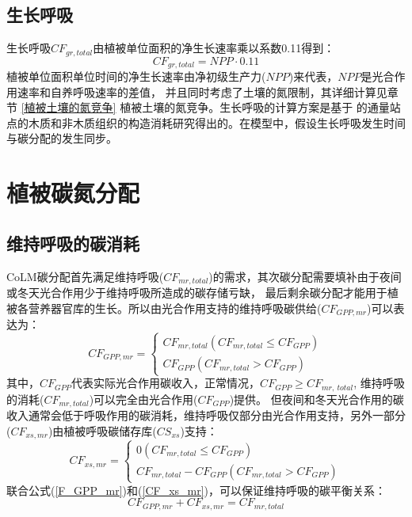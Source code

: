 \subsection{生长呼吸}\label{生长呼吸}
生长呼吸$CF_{gr,total}$由植被单位面积的净生长速率乘以系数0.11得到：
\begin{equation}
CF_{gr,total}=NPP \cdot 0.11
\end{equation}
植被单位面积单位时间的净生长速率由净初级生产力($NPP$)来代表，$NPP$是光合作用速率和自养呼吸速率的差值，
并且同时考虑了土壤的氮限制，其详细计算见章节 \ref{植被土壤的氮竞争} 植被土壤的氮竞争。生长呼吸的计算方案是基于\citet{atkins2018quantifying}
的通量站点的木质和非木质组织的构造消耗研究得出的。在模型中，假设生长呼吸发生时间与碳分配的发生同步。
\section{植被碳氮分配}\label{植被碳氮分配}
\subsection{维持呼吸的碳消耗}
CoLM碳分配首先满足维持呼吸($CF_{mr,total}$)的需求，其次碳分配需要填补由于夜间或冬天光合作用少于维持呼吸所造成的碳存储亏缺，
最后剩余碳分配才能用于植被各营养器官库的生长。所以由光合作用支持的维持呼吸碳供给($CF_{GPP,mr}$)可以表达为：
\begin{equation}\label{F_GPP_mr}
CF_{GPP,mr}=\left\{\begin{array}{c}CF_{mr, total}\left(CF_{mr, total} \leq CF_{GPP}\right) \\ CF_{GPP}\left(CF_{mr,total}>CF_{GPP}\right)\end{array}\right.
\end{equation}
其中，$CF_{GPP}$代表实际光合作用碳收入，正常情况，$CF_{GPP}\geq CF_{mr,\ total}$,
维持呼吸的消耗($CF_{mr,total}$)可以完全由光合作用($CF_{GPP}$)提供。
但夜间和冬天光合作用的碳收入通常会低于呼吸作用的碳消耗，维持呼吸仅部分由光合作用支持，另外一部分($CF_{xs,mr}$)由植被呼吸碳储存库($CS_{xs}$)支持：
\begin{equation}\label{CF_xs_mr}
CF_{xs, mr}=\left\{\begin{array}{c}0\left(CF_{mr, total} \leq CF_{GPP}\right) \\ CF_{mr, total}-CF_{GPP}\left(CF_{mr, total}>CF_{GPP}\right)\end{array}\right.
\end{equation}
联合公式(\ref{F_GPP_mr})和(\ref{CF_xs_mr})，可以保证维持呼吸的碳平衡关系：
\begin{equation}
CF_{GPP, mr}+CF_{xs, mr}=CF_{mr, total}
\end{equation}
